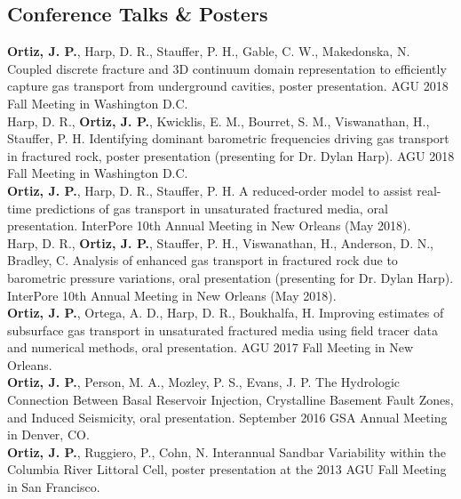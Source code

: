 \documentclass[11pt, letterpaper]{article}
\newcommand{\years}[1]{\marginnote{\scriptsize #1}}
\begin{document}
\subsection*{Conference Talks \& Posters}
\years{2018}\textbf{Ortiz, J. P.}, Harp, D. R., Stauffer, P. H., Gable, C. W., Makedonska, N. Coupled discrete fracture and 3D continuum domain representation to efficiently capture gas transport from underground cavities, poster presentation. AGU 2018 Fall Meeting in Washington D.C.\\
\years{2018}Harp, D. R., \textbf{Ortiz, J. P.}, Kwicklis, E. M., Bourret, S. M., Viswanathan, H., Stauffer, P. H. Identifying dominant barometric frequencies driving gas transport in fractured rock, poster presentation (presenting for Dr. Dylan Harp). AGU 2018 Fall Meeting in Washington D.C.\\
\years{2018}\textbf{Ortiz, J. P.}, Harp, D. R., Stauffer, P. H. A reduced-order model to assist real-time predictions of gas transport in unsaturated fractured media, oral presentation. InterPore 10th Annual Meeting in New Orleans (May 2018).\\
\years{2018}Harp, D. R., \textbf{Ortiz, J. P.}, Stauffer, P. H., Viswanathan, H., Anderson, D. N., Bradley, C. Analysis of enhanced gas transport in fractured rock due to barometric pressure variations, oral presentation (presenting for Dr. Dylan Harp). InterPore 10th Annual Meeting in New Orleans (May 2018).\\
\years{2017}\textbf{Ortiz, J. P.}, Ortega, A. D., Harp, D. R., Boukhalfa, H. Improving estimates of subsurface gas transport in unsaturated fractured media using field tracer data and numerical methods, oral presentation. AGU 2017 Fall Meeting in New Orleans.\\
\years{2016}\textbf{Ortiz, J. P.}, Person, M. A., Mozley, P. S., Evans, J. P. The Hydrologic Connection Between Basal Reservoir Injection, Crystalline Basement Fault Zones, and Induced Seismicity, oral presentation. September 2016 GSA Annual Meeting in Denver, CO.\\
\years{2013}\textbf{Ortiz, J. P.}, Ruggiero, P., Cohn, N. Interannual Sandbar Variability within the Columbia River Littoral Cell, poster presentation at the 2013 AGU Fall Meeting in San Francisco.


%
\end{document}
